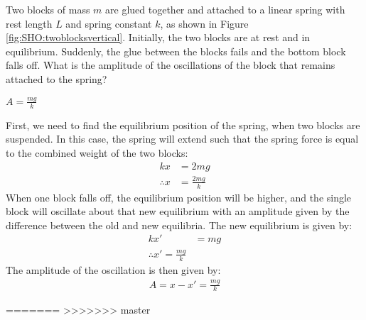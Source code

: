 \question Two blocks of mass $m$ are glued together and attached to a linear spring with rest length $L$ and spring constant $k$, as shown in Figure \ref{fig:SHO:twoblocksvertical}. Initially, the two blocks are at rest and in equilibrium. Suddenly, the glue between the blocks fails and the bottom block falls off. What is the amplitude of the oscillations of the block that remains attached to the spring?



\begin{finalanswer}
	$A = \frac{mg}{k}$
\end{finalanswer}

\begin{solution}
	
	First, we need to find the equilibrium position of the spring, when two blocks are suspended. In this case, the spring will extend such that the spring force is equal to the combined weight of the two blocks:
	\begin{align*}
	kx &= 2mg\\
	\therefore x &=\frac{2mg}{k}
	\end{align*}
	When one block falls off, the equilibrium position will be higher, and the single block will oscillate about that new equilibrium with an amplitude given by the difference between the old and new equilibria. The new equilibrium is given by:
	\begin{align*}
	kx'&=mg\\
	\therefore x'=\frac{mg}{k}
	\end{align*}
	The amplitude of the oscillation is then given by:
	\begin{align*}
	A = x-x'= \frac{mg}{k}
	\end{align*}
	
\end{solution}

=======
>>>>>>> master
